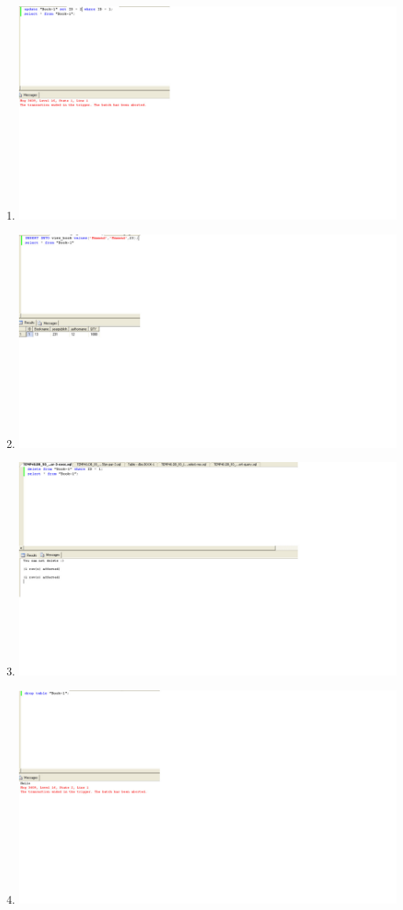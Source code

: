 \documentclass{article}
\begin{document}
\begin{enumerate}
	\item
		\includegraphics[scale=0.5]{figs/im-par-3.jpg}
	\item
		\includegraphics[scale=0.5]{figs/im-par-4-select.jpg}
	\item
		\includegraphics[scale=0.5]{figs/im-par-5.jpg}
	\item
		\includegraphics[scale=0.5]{figs/im-par-5-exec.jpg}
\end{enumerate}
\end{document}
